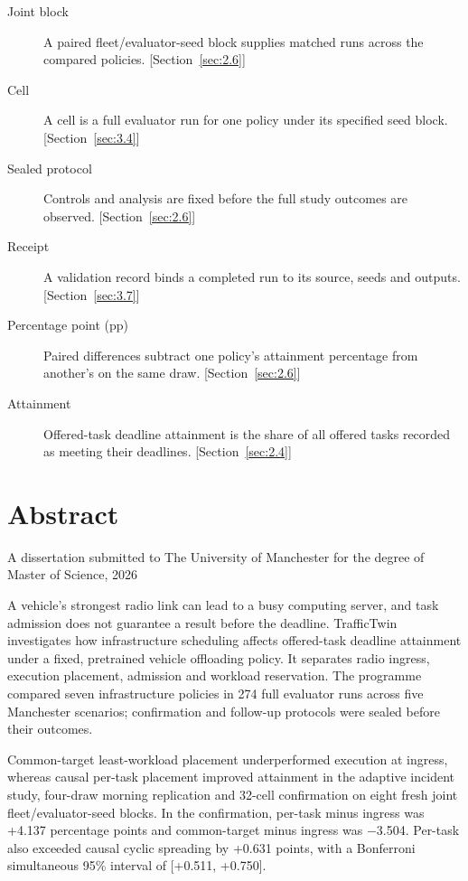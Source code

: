 \documentclass[12pt,a4paper]{article}
\begin{document}
{\begin{description}
\item[Joint block] A paired fleet/evaluator-seed block supplies matched runs across the compared policies. [Section~\ref{sec:2.6}]
\item[Cell] A cell is a full evaluator run for one policy under its specified seed block. [Section~\ref{sec:3.4}]
\item[Sealed protocol] Controls and analysis are fixed before the full study outcomes are observed. [Section~\ref{sec:2.6}]
\item[Receipt] A validation record binds a completed run to its source, seeds and outputs. [Section~\ref{sec:3.7}]
\item[Percentage point (pp)] Paired differences subtract one policy's attainment percentage from another's on the same draw. [Section~\ref{sec:2.6}]
\item[Attainment] Offered-task deadline attainment is the share of all offered tasks recorded as meeting their deadlines. [Section~\ref{sec:2.4}]
\end{description}
}
\clearpage
\onehalfspacing\RaggedRight
\section*{Abstract}\label{sec:abstract}
{\small A dissertation submitted to The University of Manchester for the degree of Master of Science, 2026\par}
\medskip

A vehicle's strongest radio link can lead to a busy computing server, and task admission does not guarantee a result before the deadline. TrafficTwin investigates how infrastructure scheduling affects offered-task deadline attainment under a fixed, pretrained vehicle offloading policy. It separates radio ingress, execution placement, admission and workload reservation. The programme compared seven infrastructure policies in 274 full evaluator runs across five Manchester scenarios; confirmation and follow-up protocols were sealed before their outcomes.

Common-target least-workload placement underperformed execution at ingress, whereas causal per-task placement improved attainment in the adaptive incident study, four-draw morning replication and 32-cell confirmation on eight fresh joint fleet/evaluator-seed blocks. In the confirmation, per-task minus ingress was +4.137 percentage points and common-target minus ingress was \ensuremath{-}3.504. Per-task also exceeded causal cyclic spreading by +0.631 points, with a Bonferroni simultaneous 95\% interval of [+0.511, +0.750].
\end{document}
